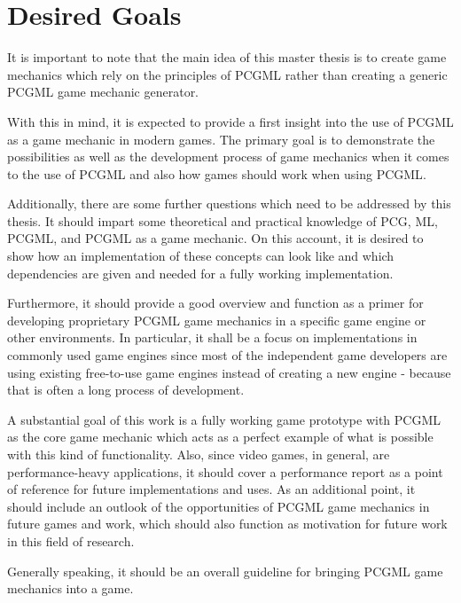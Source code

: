 \documentclass[MGS,Master,english]{twbook}%
\begin{document}
\section{Desired Goals}
It is important to note that the main idea of this master thesis is to create game mechanics which rely on the principles of \ac{PCGML} rather than creating a generic \ac{PCGML} game mechanic generator.

With this in mind, it is expected to provide a first insight into the use of \ac{PCGML} as a game mechanic in modern games. The primary goal is to demonstrate the possibilities as well as the development process of game mechanics when it comes to the use of \ac{PCGML} and also how games should work when using \ac{PCGML}.

Additionally, there are some further questions which need to be addressed by this thesis. It should impart some theoretical and practical knowledge of \ac{PCG}, \ac{ML}, \ac{PCGML}, and \ac{PCGML} as a game mechanic. On this account, it is desired to show how an implementation of these concepts can look like and which dependencies are given and needed for a fully working implementation. 

Furthermore, it should provide a good overview and function as a primer for developing proprietary \ac{PCGML} game mechanics in a specific game engine or other environments. In particular, it shall be a focus on implementations in commonly used game engines since most of the independent game developers are using existing free-to-use game engines instead of creating a new engine - because that is often a long process of development. 

A substantial goal of this work is a fully working game prototype with \ac{PCGML} as the core game mechanic which acts as a perfect example of what is possible with this kind of functionality. Also, since video games, in general, are performance-heavy applications, it should cover a performance report as a point of reference for future implementations and uses. As an additional point, it should include an outlook of the opportunities of \ac{PCGML} game mechanics in future games and work, which should also function as motivation for future work in this field of research.

Generally speaking, it should be an overall guideline for bringing \ac{PCGML} game mechanics into a game.
\end{document}
